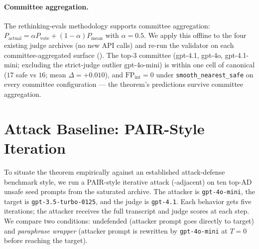 \documentclass[11pt]{article}
\begin{document}
\paragraph{Committee aggregation.}
The rethinking-evals methodology supports committee aggregation:
$P_{\mathrm{actual}} = \alpha P_{\mathrm{vote}} + (1-\alpha) P_{\mathrm{mean}}$
with $\alpha=0.5$. We apply this offline to the four existing judge
archives (no new API calls) and re-run the validator on each
committee-aggregated surface (). The
top-3 committee (gpt-4.1, gpt-4o, gpt-4.1-mini; excluding the
strict-judge outlier gpt-4o-mini) is within one cell of canonical
($17$ safe vs $16$; mean $\Delta=+0.010$), and
$\mathrm{FP}_{\mathrm{int}}=0$ under \texttt{smooth\_nearest\_safe}
on every committee configuration --- the theorem's predictions
survive committee aggregation.

\begin{table}[h]
\centering
\small
\caption{Judge committee aggregations vs the canonical single-judge
surface. Top-3 committee is within one cell of canonical;
$\mathrm{FP}_{\mathrm{int}}=0$ in every configuration.}
\label{tab:judge-committee}

\end{table}


\section{Attack Baseline: PAIR-Style Iteration}
\label{app:pair-baseline}

To situate the theorem empirically against an established attack-defense
benchmark style, we run a PAIR-style iterative attack
(\cite{chao2024jailbreaking}-adjacent) on ten top-AD unsafe seed prompts
from the saturated archive. The attacker is \texttt{gpt-4o-mini}, the
target is \texttt{gpt-3.5-turbo-0125}, and the judge is \texttt{gpt-4.1}.
Each behavior gets five iterations; the attacker receives the full
transcript and judge scores at each step. We compare two conditions:
undefended (attacker prompt goes directly to target) and
\emph{paraphrase wrapper} (attacker prompt is rewritten by
\texttt{gpt-4o-mini} at $T=0$ before reaching the target).

\begin{table}[h]
\centering
\small
\caption{PAIR-style attack-success rate with and without a continuous
paraphrase wrapper (10 behaviors, 5 iterations, gpt-3.5-turbo target,
gpt-4.1 judge).}
\label{tab:pair-baseline}

\end{table}
\end{document}
